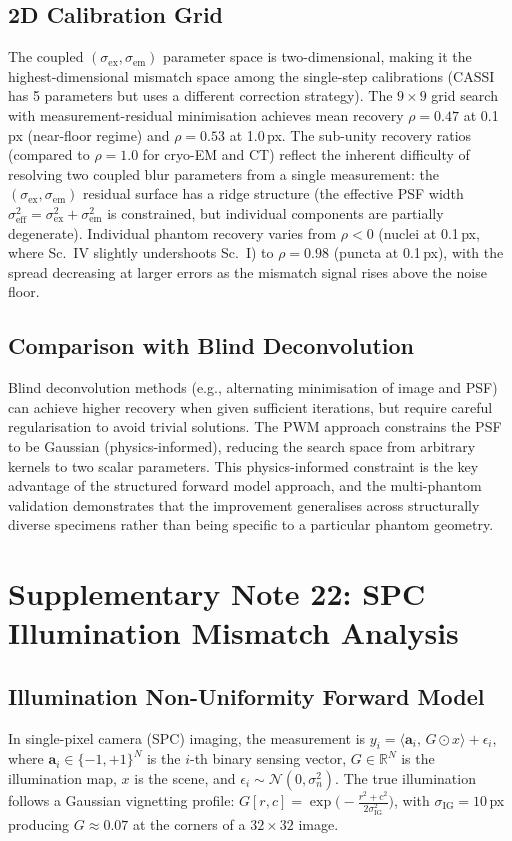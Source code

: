 \documentclass[11pt]{article}
\theoremstyle{definition}
\begin{document}
\subsection{2D Calibration Grid}
The coupled $(\sigma_{\mathrm{ex}}, \sigma_{\mathrm{em}})$ parameter space is two-dimensional, making it the highest-dimensional mismatch space among the single-step calibrations (CASSI has 5 parameters but uses a different correction strategy). The $9 \times 9$ grid search with measurement-residual minimisation achieves mean recovery $\rho{=}0.47$ at 0.1\,px (near-floor regime) and $\rho{=}0.53$ at 1.0\,px.
The sub-unity recovery ratios (compared to $\rho{=}1.0$ for cryo-EM and CT) reflect the inherent difficulty of resolving two coupled blur parameters from a single measurement: the $(\sigma_{\mathrm{ex}}, \sigma_{\mathrm{em}})$ residual surface has a ridge structure (the effective PSF width $\sigma_{\mathrm{eff}}^2 = \sigma_{\mathrm{ex}}^2 + \sigma_{\mathrm{em}}^2$ is constrained, but individual components are partially degenerate).
Individual phantom recovery varies from $\rho < 0$ (nuclei at 0.1\,px, where Sc.~IV slightly undershoots Sc.~I) to $\rho = 0.98$ (puncta at 0.1\,px), with the spread decreasing at larger errors as the mismatch signal rises above the noise floor.

\subsection{Comparison with Blind Deconvolution}
Blind deconvolution methods (e.g., alternating minimisation of image and PSF) can achieve higher recovery when given sufficient iterations, but require careful regularisation to avoid trivial solutions. The PWM approach constrains the PSF to be Gaussian (physics-informed), reducing the search space from arbitrary kernels to two scalar parameters. This physics-informed constraint is the key advantage of the structured forward model approach, and the multi-phantom validation demonstrates that the improvement generalises across structurally diverse specimens rather than being specific to a particular phantom geometry.


\section{Supplementary Note 22: SPC Illumination Mismatch Analysis}
\label{sec:note_spc}

\subsection{Illumination Non-Uniformity Forward Model}
In single-pixel camera (SPC) imaging, the measurement is $y_i = \langle \mathbf{a}_i,\, G \odot x \rangle + \epsilon_i$,
where $\mathbf{a}_i \in \{-1,+1\}^N$ is the $i$-th binary sensing vector, $G \in \mathbb{R}^N$ is the
illumination map, $x$ is the scene, and $\epsilon_i \sim \mathcal{N}(0, \sigma_n^2)$.
The true illumination follows a Gaussian vignetting profile:
$G[r,c] = \exp\!\bigl(-\tfrac{r^2 + c^2}{2\sigma_\mathrm{IG}^2}\bigr)$, with $\sigma_\mathrm{IG}{=}10$\,px
producing $G{\approx}0.07$ at the corners of a $32{\times}32$ image.
\end{document}
